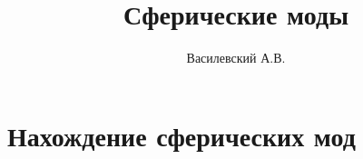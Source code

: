 \documentclass[12pt,a4paper]{article}
\title{Сферические моды}
\author{Василевский А.В.}
\begin{document}
    \maketitle
    \tableofcontents

    \section{Нахождение сферических мод}


    \nocite{*}
    
    
\end{document}
